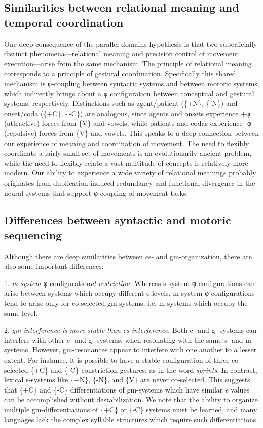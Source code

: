 \subsection{Similarities between relational meaning and temporal coordination}

One deep consequence of the parallel domains hypothesis is that two superficially distinct phenomena—relational meaning and precision control of movement execution—arise from the same mechanism. The principle of relational meaning corresponds to a principle of gestural coordination. Specifically this shared mechanism is φ-coupling between syntactic systems and between motoric systems, which indirectly brings about a φ configuration between conceptual and gestural systems, respectively. Distinctions such as agent/patient (\{+N\}, \{-N\}) and onset/coda (\{+C\}, \{-C\}) are analogous, since agents and onsets experience +φ (attractive) forces from \{V\} and vowels, while patients and codas experience -φ (repulsive) forces from \{V\} and vowels. This speaks to a deep connection between our experience of meaning and coordination of movement. The need to flexibly coordinate a fairly small set of movements is an evolutionarily ancient problem, while the need to flexibly relate a vast multitude of concepts is relatively more modern. Our ability to experience a wide variety of relational meanings probably originates from duplication-induced redundancy and functional divergence in the neural systems that support φ-coupling of movement tasks. 

\subsection{Differences between syntactic and motoric sequencing} 

Although there are deep similarities between cs- and gm-organization, there are also some important differences: 

1. \textit{m-system} φ configuration\textit{al} \textit{restriction}. Whereas s-system φ configurations can arise between systems which occupy different e-levels, m-system φ configurations tend to arise only for co-selected gm-systems, i.e. m-systems which occupy the same level. 

2. \textit{gm-interference} \textit{is} \textit{more} \textit{stable} \textit{than} \textit{cs-interference}. Both c- and g- systems can interfere with other c- and g- systems, when resonating with the same s- and m- systems. However, gm-resonances appear to interfere with one another to a lesser extent. For instance, it is possible to have a stable configuration of three co-selected \{+C\} and \{-C\} constriction gestures, as in the word \textit{sprints}. In contrast, lexical s-systems like \{+N\}, \{-N\}, and \{V\} are never co-selected. This suggests that \{+C\} and \{-C\} differentiations of gm-systems which have similar \textit{e} values can be accomplished without destabilization. We note that the ability to organize multiple gm-differentiations of \{+C\} or \{-C\} systems must be learned, and many languages lack the complex syllable structures which require such differentiations.

